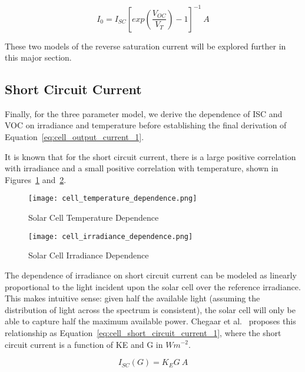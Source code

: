 \begin{equation}
    I_0 = I_{SC}[exp(\frac{V_{OC}}{V_T}) - 1]^{-1}~A
    \label{eq:cell_dark_saturation_current_2}
\end{equation}

These two models of the reverse saturation current will be explored further in
this major section.

\subsection*{Short Circuit Current}

Finally, for the three parameter model, we derive the dependence of \ac{ISC}
and \ac{VOC} on irradiance and temperature before establishing the final
derivation of Equation~\ref{eq:cell_output_current_1}.

It is known that for the short circuit current, there is a large positive
correlation with irradiance and a small positive correlation with temperature,
shown in Figures~\ref{fig:cell_temperature_dependence}
and~\ref{fig:cell_irradiance_dependence}.

\begin{figure}[h]
    \centering
    \texttt{[image: cell\_temperature\_dependence.png]}
    \caption{Solar Cell Temperature Dependence}
    \label{fig:cell_temperature_dependence}
\end{figure}

\begin{figure}[h]
    \centering
    \texttt{[image: cell\_irradiance\_dependence.png]}
    \caption{Solar Cell Irradiance Dependence}
    \label{fig:cell_irradiance_dependence}
\end{figure}

The dependence of irradiance on short circuit current can be modeled as linearly
proportional to the light incident upon the solar cell over the reference
irradiance. This makes intuitive sense: given half the available light (assuming
the distribution of light across the spectrum is consistent), the solar cell
will only be able to capture half the maximum available power. Chegaar et
al.~\cite{chegaar_et_al} proposes this relationship as
Equation~\ref{eq:cell_short_circuit_current_1}, where the short circuit current
is a function of \ac{KE} and \ac{G} in $Wm^{-2}$.

\begin{equation}
    I_{SC}(G) = K_EG~A
    \label{eq:cell_short_circuit_current_1}
\end{equation}

